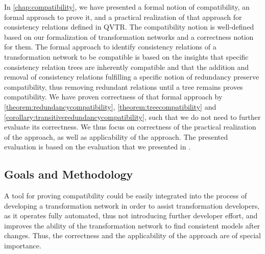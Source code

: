 In \autoref{chap:compatibility}, we have presented a formal notion of compatibility, an formal approach to prove it, and a practical realization of that approach for consistency relations defined in \gls{QVTR}.
The compatibility notion is well-defined based on our formalization of transformation networks and a correctness notion for them.
The formal approach to identify consistency relations of a transformation network to be compatible is based on the insights that specific consistency relation trees are inherently compatible and that the addition and removal of consistency relations fulfilling a specific notion of redundancy preserve compatibility, thus removing redundant relations until a tree remains proves compatibility.
We have proven correctness of that formal approach by \autoref{theorem:redundancycompatibility}, \autoref{theorem:treecompatibility} and \autoref{corollary:transitiveredundancycompatibility}, such that we do not need to further evaluate its correctness.
We thus focus on correctness of the practical realization of the approach, as well as applicability of the approach.
The presented evaluation is based on the evaluation that we presented in .


\subsection{Goals and Methodology}

A tool for proving compatibility could be easily integrated into the process of developing a transformation network in order to assist transformation developers, as it operates fully automated, thus not introducing further developer effort, and improves the ability of the transformation network to find consistent models after changes.
Thus, the correctness and the applicability of the approach are of special importance.

